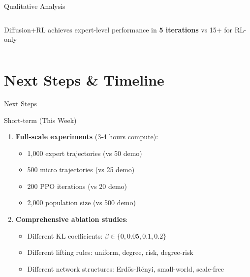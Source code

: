 \documentclass[aspectratio=169]{beamer}
\begin{document}
\begin{frame}{Qualitative Analysis}
\begin{columns}
\vspace{0.5em}
\small
Diffusion+RL achieves expert-level performance in \textbf{5 iterations} vs 15+ for RL-only

\end{columns}

\end{frame}

\section{Next Steps \& Timeline}

\begin{frame}{Next Steps}

\begin{block}{Short-term (This Week)}
\begin{enumerate}
    \item \textbf{Full-scale experiments} (3-4 hours compute):
    \begin{itemize}
        \item 1,000 expert trajectories (vs 50 demo)
        \item 500 micro trajectories (vs 25 demo)
        \item 200 PPO iterations (vs 20 demo)
        \item 2,000 population size (vs 500 demo)
    \end{itemize}

    \item \textbf{Comprehensive ablation studies}:
    \begin{itemize}
        \item Different KL coefficients: $\beta \in \{0, 0.05, 0.1, 0.2\}$
        \item Different lifting rules: uniform, degree, risk, degree-risk
        \item Different network structures: Erdős-Rényi, small-world, scale-free
    \end{itemize}
\end{enumerate}
\end{block}

\end{frame}
\end{document}
